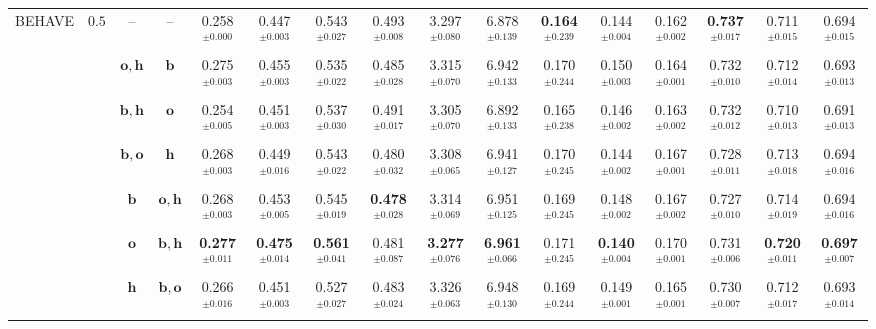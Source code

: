 \begin{table}
{\begin{tabular}{@{}cccccccccccccccc@{}}
        \multirow{7}{*}{BEHAVE} & \multirow{7}{*}{$0.5$} & -- & --
        & 0.258$^{\pm0.000}$ & 0.447$^{\pm0.003}$ & 0.543$^{\pm0.027}$ & 0.493$^{\pm0.008}$ & 3.297$^{\pm0.080}$ & 6.878$^{\pm0.139}$ & \textbf{0.164}$^{\pm0.239}$ & 0.144$^{\pm0.004}$ & 0.162$^{\pm0.002}$ & \textbf{0.737$^{\pm0.017}$} & 0.711$^{\pm0.015}$ & 0.694$^{\pm0.015}$ \\
        & & $\boldsymbol{o}, \boldsymbol{h}$ & $\boldsymbol{b}$
        & 0.275$^{\pm0.003}$ & 0.455$^{\pm0.003}$ & 0.535$^{\pm0.022}$ & 0.485$^{\pm0.028}$ & 3.315$^{\pm0.070}$ & 6.942$^{\pm0.133}$ & 0.170$^{\pm0.244}$ & 0.150$^{\pm0.003}$ & 0.164$^{\pm0.001}$ & 0.732$^{\pm0.010}$ & 0.712$^{\pm0.014}$ & 0.693$^{\pm0.013}$ \\
        & & $\boldsymbol{b}, \boldsymbol{h}$ & $\boldsymbol{o}$
        & 0.254$^{\pm0.005}$ & 0.451$^{\pm0.003}$ & 0.537$^{\pm0.030}$ & 0.491$^{\pm0.017}$ & 3.305$^{\pm0.070}$ & 6.892$^{\pm0.133}$ & 0.165$^{\pm0.238}$ & 0.146$^{\pm0.002}$ & 0.163$^{\pm0.002}$ & 0.732$^{\pm0.012}$ & 0.710$^{\pm0.013}$ & 0.691$^{\pm0.013}$\\
        & & $\boldsymbol{b}, \boldsymbol{o}$ & $\boldsymbol{h}$
        & 0.268$^{\pm0.003}$ & 0.449$^{\pm0.016}$ & 0.543$^{\pm0.022}$ & {0.480$^{\pm0.032}$} & 3.308$^{\pm0.065}$ & 6.941$^{\pm0.127}$ & 0.170$^{\pm0.245}$ & 0.144$^{\pm0.002}$ & 0.167$^{\pm0.001}$ & 0.728$^{\pm0.011}$ & 0.713$^{\pm0.018}$ & 0.694$^{\pm0.016}$\\
        & & $\boldsymbol{b}$ & $\boldsymbol{o}, \boldsymbol{h}$
        & 0.268$^{\pm0.003}$ & 0.453$^{\pm0.005}$ & {0.545$^{\pm0.019}$} & \textbf{0.478$^{\pm0.028}$} & 3.314$^{\pm0.069}$ & 6.951$^{\pm0.125}$ & 0.169$^{\pm0.245}$ & 0.148$^{\pm0.002}$ & 0.167$^{\pm0.002}$ & 0.727$^{\pm0.010}$ & 0.714$^{\pm0.019}$ & 0.694$^{\pm0.016}$ \\
        & & $\boldsymbol{o}$ & $\boldsymbol{b}, \boldsymbol{h}$
        & \textbf{0.277$^{\pm0.011}$} & \textbf{0.475$^{\pm0.014}$} & \textbf{0.561$^{\pm0.041}$} & 0.481$^{\pm0.087}$ & \textbf{3.277$^{\pm0.076}$} & \textbf{6.961$^{\pm0.066}$} & 0.171$^{\pm0.245}$ & \textbf{0.140$^{\pm0.004}$} & 0.170$^{\pm0.001}$ & 0.731$^{\pm0.006}$ & \textbf{0.720$^{\pm0.011}$} & \textbf{0.697$^{\pm0.007}$} \\
        & & $\boldsymbol{h}$ & $\boldsymbol{b}, \boldsymbol{o}$
        & 0.266$^{\pm0.016}$ & 0.451$^{\pm0.003}$ & 0.527$^{\pm0.027}$ & 0.483$^{\pm0.024}$ & 3.326$^{\pm0.063}$ & 6.948$^{\pm0.130}$ & 0.169$^{\pm0.244}$ & 0.149$^{\pm0.001}$ & 0.165$^{\pm0.001}$ & 0.730$^{\pm0.007}$ & 0.712$^{\pm0.017}$ & 0.693$^{\pm0.014}$ \\
        \cmidrule(lr){2-16}


\end{tabular}}
\end{table}
